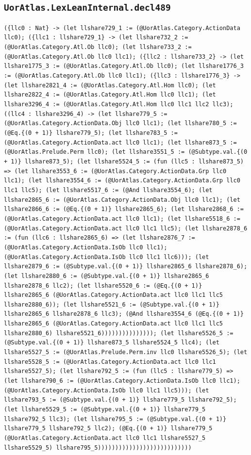 \documentclass[11pt]{article}
\begin{document}
\subsection*{\texttt{UorAtlas.LexLeanInternal.decl489}}
\noindent\texttt{(\{llc0 : Nat\} -> (let llshare729\_1 := (@UorAtlas.Category.ActionData llc0); (\{llc1 : llshare729\_1\} -> (let llshare732\_2 := (@UorAtlas.Category.Atl.Ob llc0); (let llshare733\_2 := (@UorAtlas.Category.Atl.Ob llc0 llc1); (\{llc2 : llshare733\_2\} -> (let llshare1775\_3 := (@UorAtlas.Category.Atl.Ob llc0); (let llshare1776\_3 := (@UorAtlas.Category.Atl.Ob llc0 llc1); (\{llc3 : llshare1776\_3\} -> (let llshare2821\_4 := (@UorAtlas.Category.Atl.Hom llc0); (let llshare2822\_4 := (@UorAtlas.Category.Atl.Hom llc0 llc1); (let llshare3296\_4 := (@UorAtlas.Category.Atl.Hom llc0 llc1 llc2 llc3); ((llc4 : llshare3296\_4) -> (let llshare779\_5 := (@UorAtlas.Category.ActionData.Obj llc0 llc1); (let llshare780\_5 := (@Eq.\{(0 + 1)\} llshare779\_5); (let llshare783\_5 := (@UorAtlas.Category.ActionData.act llc0 llc1); (let llshare873\_5 := (@UorAtlas.Prelude.Perm llc0); (let llshare3551\_5 := (@Subtype.val.\{(0 + 1)\} llshare873\_5); (let llshare5524\_5 := (fun (llc5 : llshare873\_5) => (let llshare3553\_6 := (@UorAtlas.Category.ActionData.Grp llc0 llc1); (let llshare3554\_6 := (@UorAtlas.Category.ActionData.Grp llc0 llc1 llc5); (let llshare5517\_6 := (@And llshare3554\_6); (let llshare2865\_6 := (@UorAtlas.Category.ActionData.Obj llc0 llc1); (let llshare2866\_6 := (@Eq.\{(0 + 1)\} llshare2865\_6); (let llshare2868\_6 := (@UorAtlas.Category.ActionData.act llc0 llc1); (let llshare5518\_6 := (@UorAtlas.Category.ActionData.act llc0 llc1 llc5); (let llshare2878\_6 := (fun (llc6 : llshare2865\_6) => (let llshare2876\_7 := (@UorAtlas.Category.ActionData.IsOb llc0 llc1); (@UorAtlas.Category.ActionData.IsOb llc0 llc1 llc6))); (let llshare2879\_6 := (@Subtype.val.\{(0 + 1)\} llshare2865\_6 llshare2878\_6); (let llshare2880\_6 := (@Subtype.val.\{(0 + 1)\} llshare2865\_6 llshare2878\_6 llc2); (let llshare5520\_6 := (@Eq.\{(0 + 1)\} llshare2865\_6 (@UorAtlas.Category.ActionData.act llc0 llc1 llc5 llshare2880\_6)); (let llshare5521\_6 := (@Subtype.val.\{(0 + 1)\} llshare2865\_6 llshare2878\_6 llc3); (@And llshare3554\_6 (@Eq.\{(0 + 1)\} llshare2865\_6 (@UorAtlas.Category.ActionData.act llc0 llc1 llc5 llshare2880\_6) llshare5521\_6))))))))))))))); (let llshare5526\_5 := (@Subtype.val.\{(0 + 1)\} llshare873\_5 llshare5524\_5 llc4); (let llshare5527\_5 := (@UorAtlas.Prelude.Perm.inv llc0 llshare5526\_5); (let llshare5528\_5 := (@UorAtlas.Category.ActionData.act llc0 llc1 llshare5527\_5); (let llshare792\_5 := (fun (llc5 : llshare779\_5) => (let llshare790\_6 := (@UorAtlas.Category.ActionData.IsOb llc0 llc1); (@UorAtlas.Category.ActionData.IsOb llc0 llc1 llc5))); (let llshare793\_5 := (@Subtype.val.\{(0 + 1)\} llshare779\_5 llshare792\_5); (let llshare5529\_5 := (@Subtype.val.\{(0 + 1)\} llshare779\_5 llshare792\_5 llc3); (let llshare795\_5 := (@Subtype.val.\{(0 + 1)\} llshare779\_5 llshare792\_5 llc2); (@Eq.\{(0 + 1)\} llshare779\_5 (@UorAtlas.Category.ActionData.act llc0 llc1 llshare5527\_5 llshare5529\_5) llshare795\_5)))))))))))))))))))))))))))}\par
\end{document}
